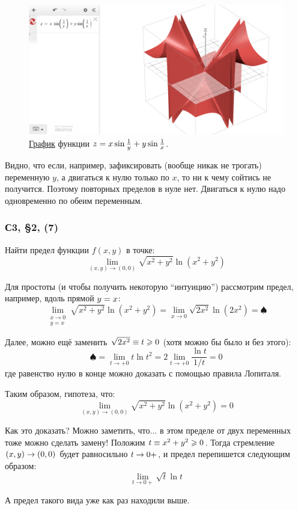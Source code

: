 \documentclass[a4paper,12pt]{article}
\begin{document}
\begin{solution}
    \begin{figure}[ht]
      \centering
  
      \includegraphics[width=0.8\columnwidth]{plot_3d}
  
      \caption{
        \href{https://www.desmos.com/3d}{График} функции $z \hm= x \sin \frac{1}{y} + y \sin \frac{1}{x}$.
      }
      \label{fig:plot_3d}
    \end{figure}
    
    Видно, что если, например, зафиксировать (вообще никак не трогать) переменную $y$, а двигаться к нулю только по $x$, то ни к чему сойтись не получится.
    Поэтому повторных пределов в нуле нет.
    Двигаться к нулю надо одновременно по обеим переменным.
  \end{solution}


  \subsubsection{С3, \S 2, (7)}

  Найти предел функции $f(x, y)$ в точке:
  \[
    \lim_{(x, y) \to (0, 0)} \sqrt{x^2 + y^2} \ln (x^2 + y^2)
  \]
  
  \begin{solution}

    Для простоты (и чтобы получить некоторую ``интуицию'') рассмотрим предел, например, вдоль прямой $y \hm= x$:
    \[
      \lim_{\substack{x \to 0\\ y = x}} \sqrt{x^2 + y^2} \ln (x^2 + y^2) = \lim_{x \to 0} \sqrt{2 x^2} \ln (2 x^2) = \spadesuit
    \]

    Далее, можно ещё заменить $\sqrt{2x^2} \hm\equiv t \hm\geq 0$ (хотя можно бы было и без этого):
    \[
      \spadesuit = \lim_{t \to +0} t \ln t^2 = 2 \lim_{t \to +0} \frac{\ln t}{1/t} = 0
    \]
    где равенство нулю в конце можно доказать с помощью правила Лопиталя.

    Таким образом, гипотеза, что:
    \[
      \lim_{(x, y) \to (0, 0)} \sqrt{x^2 + y^2} \ln (x^2 + y^2) = 0
    \]

    Как это доказать?
    Можно заметить, что... в этом пределе от двух переменных тоже можно сделать замену!
    Положим $t \hm\equiv x^2 \hm+ y^2 \hm\geq 0$.
    Тогда стремление $(x, y) \hm\to (0, 0)$ будет равносильно $t \hm\to 0+$, и предел перепишется следующим образом:
    \[
      \lim_{t \to 0+} \sqrt{t} \ln t
    \]

    А предел такого вида уже как раз находили выше.
  \end{solution}
\end{document}
